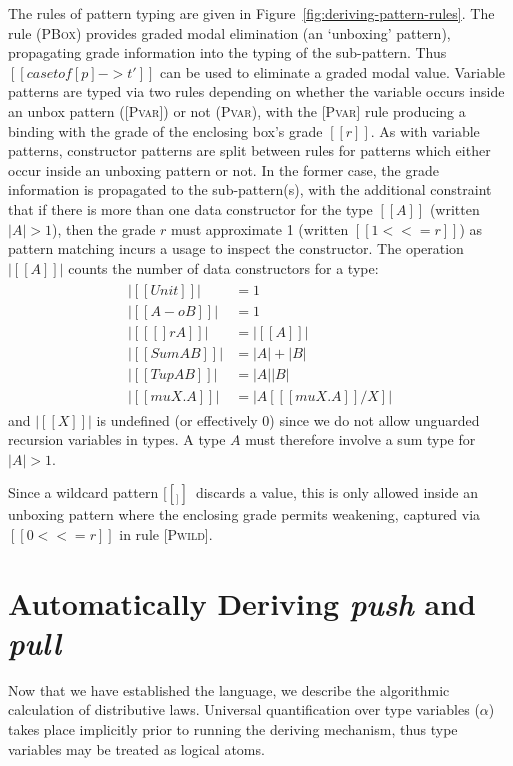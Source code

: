 The rules of pattern typing are given in
Figure~\ref{fig:deriving-pattern-rules}.
The rule (\textsc{PBox}) provides
graded modal elimination (an `unboxing' pattern),
propagating grade information into the typing of the
sub-pattern. Thus $[[ case t of [p] -> t' ]]$ can be used to eliminate
a graded modal value. Variable patterns are typed via two
rules depending on whether the variable occurs inside an unbox pattern
(\textsc{[Pvar]}) or not (\textsc{Pvar}),
with the \textsc{[Pvar]} rule producing a binding with the grade of
the enclosing box’s grade $[[ r ]]$.
As with variable patterns, constructor patterns are split
between rules for patterns which either occur inside an unboxing
pattern or not. In the former case, the grade information is
propagated to the sub-pattern(s), with the additional constraint that
if there is more than one data constructor for the type $[[ A ]]$ (written
$|A| > 1$), then the grade $r$ must approximate 1 (written $[[ 1 <<= r
]]$) as pattern matching
incurs a usage to inspect the constructor. The
operation $|[[ A ]]|$ counts the number of data constructors
for a type:
%
\begin{align*}
  \begin{array}{ll}
|[[ Unit ]]| &= 1 \\
|[[ A -o B ]]| &= 1 \\
|[[ [] r A ]]| &= |[[  A ]]| \\
|[[ Sum A B ]]| &= |A| + |B| \\
|[[ Tup A B ]]| &= |A| |B| \\
|[[ mu X . A ]]| &= |A [ [[ mu X . A ]] / X ]|
  \end{array}
\end{align*}
%
and $|[[ X ]]|$ is undefined (or effectively 0) since we do not
allow unguarded recursion variables in types.
A type $A$ must therefore involve a sum type for $|A| > 1$.

Since a wildcard pattern $[[ _ ]]\,$ discards a value, this is only
allowed inside an unboxing pattern where the enclosing grade
permits weakening, captured via $[[ 0 <<= r ]]$ in rule \textsc{[Pwild]}.

\section{Automatically Deriving \emph{push} and \emph{pull}}
\label{sec:push-pull-deriv}
Now that we have established the language, we describe the algorithmic
calculation of distributive laws. Universal quantification over type variables
($\alpha$) takes place implicitly prior to running the deriving mechanism, thus
 type variables may be treated as logical atoms.

